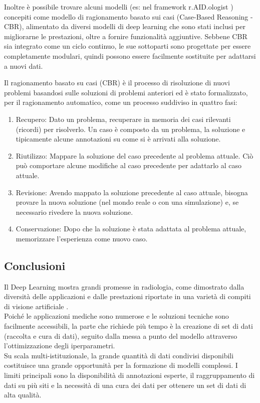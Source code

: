 \documentclass[12pt,a4paper]{report}
\begin{document}
Inoltre è possibile trovare alcuni modelli (es: nel framework r.AID.ologist \cite{r.AID.ologist}) concepiti come modello di ragionamento basato sui casi (Case-Based Reasoning - CBR), alimentato da diversi modelli di deep learning che sono stati inclusi per migliorarne le prestazioni, oltre a fornire funzionalità aggiuntive.
Sebbene CBR sia integrato come un ciclo continuo, le sue sottoparti sono progettate per essere completamente modulari, quindi possono essere facilmente sostituite per adattarsi a nuovi dati.

Il ragionamento basato su casi (CBR) è il processo di risoluzione di nuovi problemi basandosi sulle soluzioni di problemi anteriori ed è stato formalizzato, per il ragionamento automatico, come un processo suddiviso in quattro fasi:
\begin{enumerate}
\item Recupero: Dato un problema, recuperare in memoria dei casi rilevanti (ricordi) per risolverlo. Un caso è composto da un problema, la soluzione e tipicamente alcune annotazioni su come si è arrivati alla soluzione.
\item Riutilizzo: Mappare la soluzione del caso precedente al problema attuale. Ciò può comportare alcune modifiche al caso precedente per adattarlo al caso attuale.
\item Revisione: Avendo mappato la soluzione precedente al caso attuale, bisogna provare la nuova soluzione (nel mondo reale o con una simulazione) e, se necessario rivedere la nuova soluzione.
\item Conservazione: Dopo che la soluzione è stata adattata al problema attuale, memorizzare l'esperienza come nuovo caso.
\end{enumerate}

\subsection{Conclusioni}
Il Deep Learning mostra grandi promesse in radiologia, come dimostrato dalla diversità delle applicazioni e dalle prestazioni riportate in una varietà di compiti di visione artificiale \cite{montagnon2020deep}.\\
Poiché le applicazioni mediche sono numerose e le soluzioni tecniche sono facilmente accessibili, la parte che richiede più tempo è la creazione di set di dati (raccolta e cura di dati), seguito dalla messa a punto del modello attraverso l'ottimizzazione degli iperparametri.\\
Su scala multi-istituzionale, la grande quantità di dati condivisi disponibili costituisce una grande opportunità per la formazione di modelli complessi. I limiti principali sono la disponibilità di annotazioni esperte, il raggruppamento di dati su più siti e la necessità di una cura dei dati per ottenere un set di dati di alta qualità. 
\end{document}

